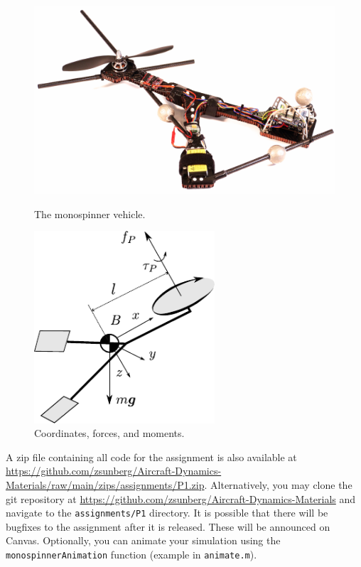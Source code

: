 \documentclass{article}
\theoremstyle{definition}
\begin{document}
\begin{figure}[h]
\centering
\begin{minipage}{0.9\textwidth}
\begin{minipage}{0.5\textwidth}
        \centering
        \includegraphics[width=\textwidth]{monospinner.pdf}
        \caption{The monospinner vehicle.}
\end{minipage}
\begin{minipage}{0.5\textwidth}
        \centering
        \includegraphics[width=0.6\textwidth]{monospinner-coordinates.pdf}
        \caption{Coordinates, forces, and moments.}
\end{minipage}
\end{minipage}
\end{figure}

A zip file containing all code for the assignment is also available at \url{https://github.com/zsunberg/Aircraft-Dynamics-Materials/raw/main/zips/assignments/P1.zip}.
Alternatively, you may clone the git repository at \url{https://github.com/zsunberg/Aircraft-Dynamics-Materials} and navigate to the \texttt{assignments/P1} directory. 
It is possible that there will be bugfixes to the assignment after it is released. These will be announced on Canvas. Optionally, you can animate your simulation using the \texttt{monospinnerAnimation} function (example in \texttt{animate.m}).
\end{document}
